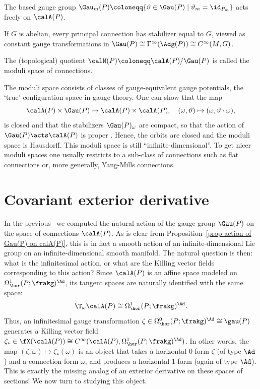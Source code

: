 \begin{cor}
    The based gauge group $\Gau_m(P)\coloneqq \{\vartheta\in \Gau(P)\mid \vartheta_m=\id_{P_m}\}$ acts freely on $\calA(P)$.
\end{cor}
\begin{cor}
    If $G$ is abelian, every principal connection has stabilizer equal to $G$, viewed as constant gauge transformations in $\Gau(P)\cong \Gamma^\infty(\Adg(P))\cong C^\infty(M,G)$.
\end{cor}

\begin{defn}
    The (topological) quotient $\calM(P)\coloneqq \calA(P)\slash \Gau(P)$ is called the moduli space of connections. 
\end{defn}

The moduli space consists of classes of gauge-equivalent gauge potentials, the `true' configuration space in gauge theory. One can show that the map 
\[\calA(P)\times\Gau(P)\to \calA(P)\times\calA(P),\quad (\omega,\vartheta)\mapsto (\omega,\vartheta\cdot\omega),\]
is closed and that the stabilizers $\Gau(P)_\omega$ are compact, so that the action of $\Gau(P)\acts\calA(P)$ is proper \cite[Thm.~6.1.7]{RS2}. Hence, the orbits are closed and the moduli space is Hausdorff. This moduli space is still ``infinite-dimensional''. To get nicer moduli spaces one usually restricts to a sub-class of connections such as flat connections or, more generally, Yang-Mills connections.







\section{Covariant exterior derivative}\label{sec: cov ext derivative}



In the previous \sect\ we computed the natural action of the gauge group $\Gau(P)$ on the space of connections $\calA(P)$. As is clear from Proposition~\ref{prop action of Gau(P) on calA(P)}, this is in fact a smooth action of an infinite-dimensional Lie group on an infinite-dimensional smooth manifold. The natural question is then: what is the infinitesimal action, or what are the Killing vector fields corresponding to this action? Since $\calA(P)$ is an affine space modeled on $\Omega^1_{\hor}(P;\frakg)^\Ad$, its tangent spaces are naturally identified with the same space:
\[\T_\omega\calA(P)\cong \Omega^1_{\hor}(P;\frakg)^\Ad.\]
Thus, an infinitesimal gauge transformation $\zeta\in\Omega^0_{\hor}(P;\frakg)^\Ad\cong\gau(P)$ generates a Killing vector field $\zeta_\ast\in \fX(\calA(P))\cong C^\infty(\calA(P),\Omega^1_{\hor}(P;\frakg)^\Ad)$. In other words, the map $(\zeta,\omega)\mapsto\zeta_\ast(\omega)$ is an object that takes a horizontal $0$-form $\zeta$ (of type $\Ad$) and a connection form $\omega$, and produces a horizontal $1$-form (again of type $\Ad$). This is exactly the missing analog of an exterior derivative on these spaces of sections! We now turn to studying this object.

